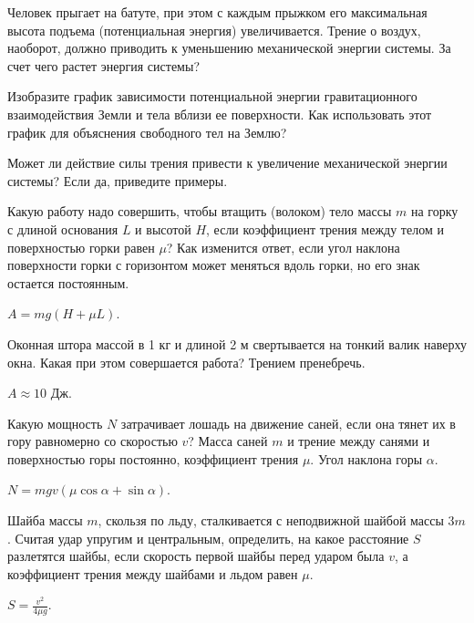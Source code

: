 \begin{ex}
Человек прыгает на батуте, при этом с каждым прыжком его максимальная высота подъема (потенциальная энергия) увеличивается. Трение о воздух, наоборот, должно приводить к уменьшению механической энергии системы. За счет чего растет энергия системы?
\end{ex}

\begin{ex}
Изобразите график зависимости потенциальной энергии гравитационного взаимодействия Земли и тела вблизи ее поверхности. Как использовать этот график для объяснения свободного тел на Землю?
\end{ex}

\begin{ex}
Может ли действие силы трения привести к увеличение механической энергии системы? Если да, приведите примеры. 
\end{ex}

\simpleProblems

\begin{ex} %
Какую работу надо совершить, чтобы втащить (волоком) тело массы $m$ на горку с длиной основания $L$ и высотой $H$, если коэффициент трения между телом и поверхностью горки равен $\mu$? Как изменится ответ, если угол наклона поверхности горки с горизонтом может меняться вдоль горки, но его знак остается постоянным.
\begin{ans}
$A=mg(H+\mu L)$.
\end{ans}
\end{ex}

\begin{ex}
Оконная штора массой в 1 кг и длиной 2 м свертывается на тонкий валик наверху окна. Какая при этом совершается работа? Трением пренебречь.
\begin{ans}
$A \approx 10$ Дж.
\end{ans}
\end{ex}

\begin{ex} %
Какую мощность $N$ затрачивает лошадь на движение саней, если она тянет их в гору равномерно со скоростью $v$? Масса саней $m$ и трение между санями и поверхностью горы постоянно, коэффициент трения $\mu$. Угол наклона горы $\alpha$.
\begin{ans}
$N = mgv(\mu \cos \alpha +\sin \alpha)$.
\end{ans}
\end{ex}

\begin{ex} %
Шайба массы $m$, скользя по льду, сталкивается с неподвижной шайбой массы $3m$. Считая удар упругим и центральным, определить, на какое расстояние $S$ разлетятся шайбы, если скорость первой шайбы перед ударом была $v$, а коэффициент трения между шайбами и льдом равен $\mu$.
\begin{ans}
$S = \frac{v^2}{4 \mu g}$.
\end{ans}
\end{ex}

